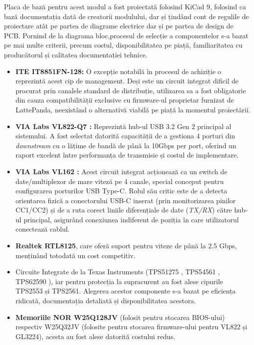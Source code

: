 Placa de bază pentru acest modul a fost proiectată folosind KiCad 9, folosind ca bază documentația dată de creatorii modulului, dar și țindând cont de regulile de proiectare atât pe partea de diagrame electrice dar și pe partea de design de \ac{PCB}.
Pornind de la diagrama bloc,procesul de selecție a componentelor s-a bazat pe mai multe criterii, precum costul, disponibilitatea pe piață, familiaritatea cu producătorul și calitatea documentației tehnice.
\begin{itemize}
  \item \textbf{ITE IT8851FN-128:} O excepție notabilă în procesul de achiziție o reprezintă acest cip de management. Deși este un circuit integrat dificil de procurat prin canalele standard de distribuție, utilizarea sa a fost obligatorie din cauza compatibilității exclusive cu firmware-ul proprietar furnizat de LattePanda, neexistând o alternativă viabilă pe piață la momentul proiectării.
  \item \textbf{VIA Labs VL822-Q7 \cite{VL822-Q7}:} Reprezintă hub-ul USB 3.2 Gen 2 principal al sistemului. A fost selectat datorită capacității de a gestiona 4 porturi din \textit{downstream} cu o lățime de bandă de până la \mbox{10\text{\,}Gbps} per port, oferind un raport excelent între performanța de transmisie și costul de implementare.
  \item \textbf{VIA Labs VL162 \cite{VL162}:} Acest circuit integrat acționează ca un switch de date/multiplexor de mare viteză pe 4 canale, special conceput pentru configurarea porturilor USB Type-C. Rolul său critic este de a detecta orientarea fizică a conectorului USB-C inserat (prin monitorizarea pinilor CC1/CC2) și de a ruta corect liniile diferențiale de date (\textit{TX/RX}) către hub-ul principal, asigurând conexiunea indiferent de poziția în care utilizatorul conectează cablul.
  \item \textbf{Realtek RTL8125}, care oferă suport pentru viteze de până la 2.5 Gbps, menținând totodată un cost competitiv.
  \item Circuite Integrate de la Texas Instruments (TPS51275 \cite{TPS51275}, TPS54561 \cite{TPS54561}, TPS62590 \cite{TPS62590}), iar pentru protecția la supracurent au fost alese cipurile TPS2553 și TPS2561. Alegerea acestor componente s-a bazat pe eficiența ridicată, documentația detaliată și disponibilitatea acestora.
  \item \textbf{Memoriile NOR W25Q128JV} (folosit pentru stocarea BIOS-ului) respectiv W25Q32JV (folosite pentru stocarea firmware-ului pentru VL822 și GL3224), acesta au fost alese datorită costului redus.

\end{itemize}
